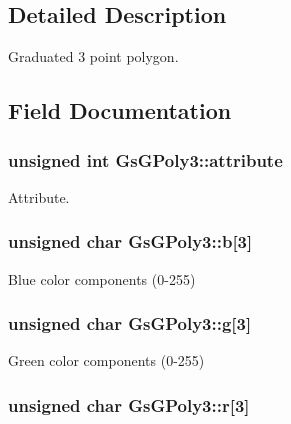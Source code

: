 \subsection{Detailed Description}
Graduated 3 point polygon. 

\subsection{Field Documentation}
\hypertarget{structGsGPoly3_a3c8f401c79e4238327f6068479de9c48}{}
\subsubsection[{attribute}]{\setlength{\rightskip}{0pt plus 5cm}unsigned int Gs\+G\+Poly3\+::attribute}\label{structGsGPoly3_a3c8f401c79e4238327f6068479de9c48}


Attribute. 

\hypertarget{structGsGPoly3_ab14e694e5e825fc17a3bdec4e54dae59}{}
\subsubsection[{b}]{\setlength{\rightskip}{0pt plus 5cm}unsigned char Gs\+G\+Poly3\+::b\mbox{[}3\mbox{]}}\label{structGsGPoly3_ab14e694e5e825fc17a3bdec4e54dae59}


Blue color components (0-\/255) 

\hypertarget{structGsGPoly3_ac2480a7e16ac62b8560faa7b5c8fc69b}{}
\subsubsection[{g}]{\setlength{\rightskip}{0pt plus 5cm}unsigned char Gs\+G\+Poly3\+::g\mbox{[}3\mbox{]}}\label{structGsGPoly3_ac2480a7e16ac62b8560faa7b5c8fc69b}


Green color components (0-\/255) 

\hypertarget{structGsGPoly3_a9d8181d4a7c066a57d9f38a76f04284b}{}
\subsubsection[{r}]{\setlength{\rightskip}{0pt plus 5cm}unsigned char Gs\+G\+Poly3\+::r\mbox{[}3\mbox{]}}\label{structGsGPoly3_a9d8181d4a7c066a57d9f38a76f04284b}


